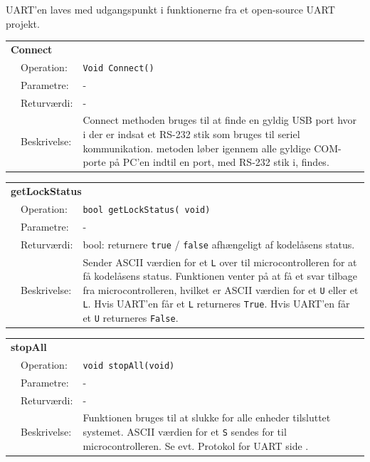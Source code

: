 UART'en laves med udgangspunkt i funktionerne fra et open-source UART projekt. \cite{lib:UART}

\begin{table}[h]
\begin{tabularx}{\textwidth}{p{0.6 cm} l X} %
\multicolumn{3}{l}{\textbf{Connect}}\\
& Operation: & 
\texttt{Void Connect()}
\\ & Parametre: & 
 - 
\\ & Returværdi: & 
-
\\ & Beskrivelse: & 
Connect methoden bruges til at finde en gyldig USB port hvor i der er indsat et RS-232 stik som bruges til seriel kommunikation. metoden løber igennem alle gyldige COM-porte på PC'en indtil en port, med RS-232 stik i, findes.
\\ \end{tabularx}
\end{table}
\clearpage

\begin{table}[h]
\begin{tabularx}{\textwidth}{p{0.6 cm} l X} %
\multicolumn{3}{l}{\textbf{getLockStatus}}\\
& Operation: & 
\texttt{bool getLockStatus( void)}
\\ & Parametre: & 
 - 
\\ & Returværdi: & 
bool: returnere \texttt{true} / \texttt{false} afhængeligt af kodelåsens status.
\\ & Beskrivelse: & 
Sender ASCII værdien for et \texttt{L} over til microcontrolleren for at få kodelåsens status. Funktionen venter på at få et svar tilbage fra microcontrolleren, hvilket er ASCII værdien for et \texttt{U} eller et \texttt{L}.
Hvis UART'en får et \texttt{L} returneres \texttt{True}.
Hvis UART'en får et \texttt{U} returneres \texttt{False}.
\\ \end{tabularx}
\end{table}

\begin{table}[h]
\begin{tabularx}{\textwidth}{p{0.6 cm} l X} %
\multicolumn{3}{l}{\textbf{stopAll}}\\
& Operation: & 
\texttt{void stopAll(void)}
\\ & Parametre: & 
 - 
\\ & Returværdi: & 
-
\\ & Beskrivelse: & 
Funktionen bruges til at slukke for alle enheder tilsluttet systemet. ASCII værdien for et \texttt{S} sendes for til  microcontrolleren. Se evt. Protokol for UART side \pageref{prot_UART}.
\\ \end{tabularx}
\end{table}

